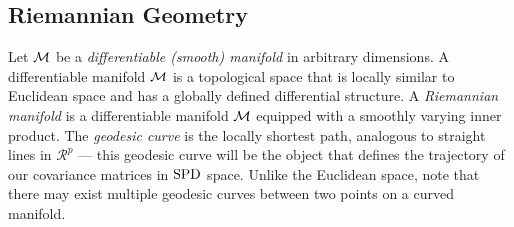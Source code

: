 \subsection{Riemannian Geometry}

Let $\mathcal{M}$ be a \textit{differentiable (smooth) manifold} in arbitrary dimensions.
A differentiable manifold $\mathcal{M}$ is a topological
space that is locally similar to Euclidean space and has a globally
defined differential structure. 
%
%
A \textit{Riemannian manifold} is a differentiable manifold $\mathcal{M}$ equipped with a smoothly varying inner product.
The \textit{geodesic curve} is the locally shortest path, analogous to straight lines in $\mathcal{R}^{p}$ --- this geodesic 
curve will be the object that defines the trajectory of our covariance matrices in $\text{SPD}$ space. 
Unlike the Euclidean space, note that there may exist multiple geodesic curves between two points on a curved manifold. 
